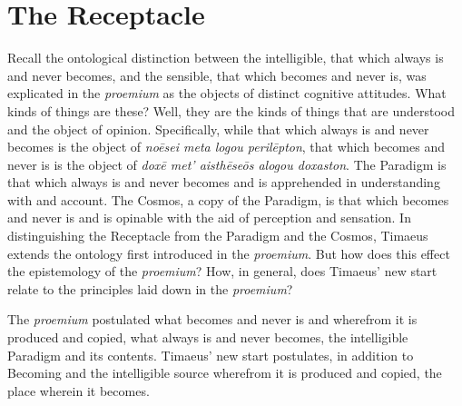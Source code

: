 

\section{The Receptacle} %
\label{sec:the_receptacle}



Recall the ontological distinction between the intelligible, that which always is and never becomes, and the sensible, that which becomes and never is, was explicated in the \emph{proemium} as the objects of distinct cognitive attitudes. What kinds of things are these? Well, they are the kinds of things that are understood and the object of opinion. Specifically, while that which always is and never becomes is the object of \emph{noēsei meta logou perilēpton}, that which becomes and never is is the object of \emph{doxē met’ aisthēseōs alogou doxaston}. The Paradigm is that which always is and never becomes and is apprehended in understanding with and account. The Cosmos, a copy of the Paradigm, is that which becomes and never is and is opinable with the aid of perception and sensation. In distinguishing the Receptacle from the Paradigm and the Cosmos, Timaeus extends the ontology first introduced in the \emph{proemium}. But how does this effect the epistemology of the \emph{proemium}? How, in general, does Timaeus' new start relate to the principles laid down in the \emph{proemium}?

The \emph{proemium} postulated what becomes and never is and wherefrom it is produced and copied, what always is and never becomes, the intelligible Paradigm and its contents. Timaeus' new start postulates, in addition to Becoming and the intelligible source wherefrom it is produced and copied, the place wherein it becomes.


